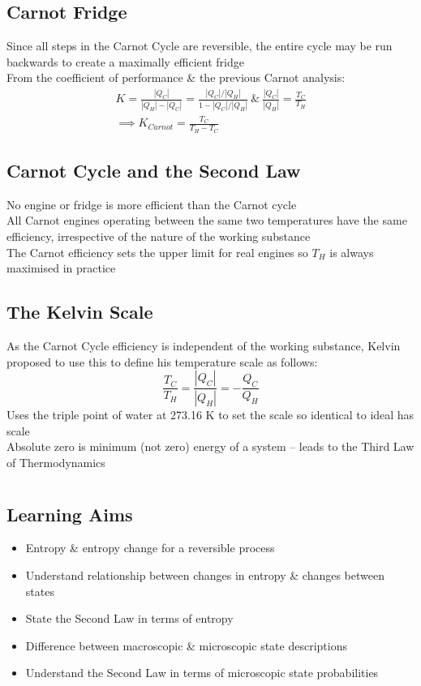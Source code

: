 \documentclass[a4paper, 11pt, normalem]{report}
\begin{document}
\section{Carnot Fridge}
Since all steps in the Carnot Cycle are reversible, the entire cycle may be run backwards to create a maximally efficient fridge \\
From the coefficient of performance \& the previous Carnot analysis:
\begin{gather*}
	K = \frac{|Q_{C}|}{|Q_{H}| - |Q_{C}|} = \frac{|Q_{C}|/|Q_{H}|}{1 - |Q_{C}|/|Q_{H}|} ~\&~ \frac{|Q_{C}|}{|Q_{H}|} = \frac{T_{C}}{T_{H}} \\
	\implies K_{Carnot} = \frac{T_{C}}{T_{H} - T_{C}}
\end{gather*}

\section{Carnot Cycle and the Second Law}
No engine or fridge is more efficient than the Carnot cycle \\
All Carnot engines operating between the same two temperatures have the same efficiency, irrespective of the nature of the working substance \\
The Carnot efficiency sets the upper limit for real engines so $T_{H}$ is always maximised in practice

\section{The Kelvin Scale}
As the Carnot Cycle efficiency is independent of the working substance, Kelvin proposed to use this to define his temperature scale as follows:
\begin{equation*}
	\frac{T_{C}}{T_{H}} = \frac{|Q_{C}|}{|Q_{H}|} = -\frac{Q_{C}}{Q_{H}}
\end{equation*}
Uses the triple point of water at 273.16 K to set the scale so identical to ideal has scale \\
Absolute zero is minimum (not zero) energy of a system -- leads to the Third Law of Thermodynamics

\chapter{}
\thispagestyle{fancy}
\section{Learning Aims}
\begin{itemize}
	\item Entropy \& entropy change for a reversible process
	\item Understand relationship between changes in entropy \& changes between states
	\item State the Second Law in terms of entropy
	\item Difference between macroscopic \& microscopic state descriptions
	\item Understand the Second Law in terms of microscopic state probabilities
\end{itemize}
\end{document}
